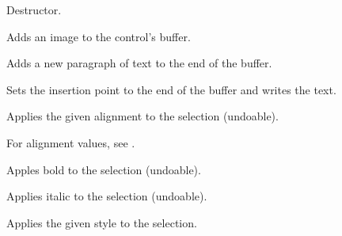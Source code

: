
Destructor.

\label{wxrichtextctrladdimage}


Adds an image to the control's buffer.

\label{wxrichtextctrladdparagraph}


Adds a new paragraph of text to the end of the buffer.

\label{wxrichtextctrlappendtext}


Sets the insertion point to the end of the buffer and writes the text.

\label{wxrichtextctrlapplyalignmenttoselection}


Applies the given alignment to the selection (undoable).

For alignment values, see .

\label{wxrichtextctrlapplyboldtoselection}


Apples bold to the selection (undoable).

\label{wxrichtextctrlapplyitalictoselection}


Applies italic to the selection (undoable).

\label{wxrichtextctrlapplystyle}


Applies the given style to the selection.

\label{wxrichtextctrlapplystylesheet}


